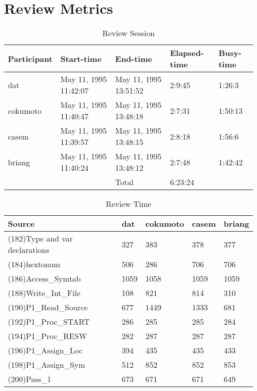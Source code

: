 \section{Review Metrics}
\begin{table}[hb]
\begin{center}
\begin{tabular}{|l|l|l|l|l|}
\hline
Participant & Start-time & End-time & Elapsed-time & Busy-time \\
\hline
dat & May 11, 1995 11:42:07 & May 11, 1995 13:51:52 & 2:9:45 & 1:26:3 \\
cokumoto & May 11, 1995 11:40:47 & May 11, 1995 13:48:18 & 2:7:31 & 1:50:13 \\
casem & May 11, 1995 11:39:57 & May 11, 1995 13:48:15 & 2:8:18 & 1:56:6 \\
briang & May 11, 1995 11:40:24 & May 11, 1995 13:48:12 & 2:7:48 & 1:42:42 \\
\hline
 & & Total & 6:23:24 & \\
\hline
\end{tabular}
\end{center}
\caption{Review Session}
\end{table}


\begin{table}[hb]
\begin{center}
\begin{tabular}{|l|l|l|l|l|}
\hline
Source & dat & cokumoto & casem & briang\\
\hline
(182)Type and var declarations & 327 & 383 & 378 & 377\\
(184)hextonum & 506 & 286 & 706 & 706\\
(186)Access\_Symtab & 1059 & 1058 & 1059 & 1059\\
(188)Write\_Int\_File & 108 & 821 & 814 & 310\\
(190)P1\_Read\_Source & 677 & 1449 & 1333 & 681\\
(192)P1\_Proc\_START & 286 & 285 & 285 & 284\\
(194)P1\_Proc\_RESW & 282 & 287 & 287 & 287\\
(196)P1\_Assign\_Loc & 394 & 435 & 435 & 433\\
(198)P1\_Assign\_Sym & 512 & 852 & 852 & 853\\
(200)Pass\_1 & 673 & 671 & 671 & 649\\
\hline
\end{tabular}
\end{center}
\caption{Review Time}
\end{table}

